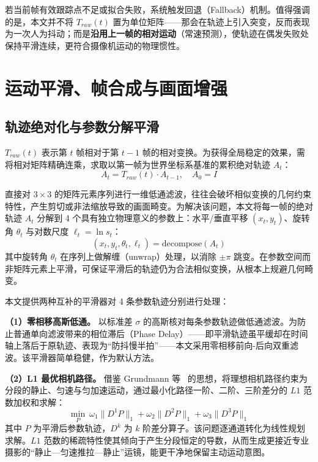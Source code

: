\documentclass[10.5pt,twocolumn]{aaas}
\begin{document}
若当前帧有效跟踪点不足或拟合失败，系统触发回退（Fallback）机制。值得强调的是，本文并不将 $T_{raw}(t)$ 置为单位矩阵——那会在轨迹上引入突变，反而表现为一次人为抖动；而是\textbf{沿用上一帧的相对运动}（常速预测），使轨迹在偶发失败处保持平滑连续，更符合摄像机运动的物理惯性。

\section{运动平滑、帧合成与画面增强}
\subsection{轨迹绝对化与参数分解平滑}
$T_{raw}(t)$ 表示第 $t$ 帧相对于第 $t-1$ 帧的相对变换。为获得全局稳定的效果，需将相对矩阵精确连乘，求取以第一帧为世界坐标系基准的累积绝对轨迹 $A_t$：
\begin{equation}
A_t = T_{raw}(t) \cdot A_{t-1}, \quad A_0 = I
\end{equation}

直接对 $3 \times 3$ 的矩阵元素序列进行一维低通滤波，往往会破坏相似变换的几何约束特性，产生剪切或非法缩放导致的画面畸变。为解决该问题，本文将每一帧的绝对轨迹 $A_t$ 分解到 4 个具有独立物理意义的参数上：水平/垂直平移 $(x_t, y_t)$、旋转角 $\theta_t$ 与对数尺度 $\ell_t=\ln s_t$：
\begin{equation}
(x_t, y_t, \theta_t, \ell_t) = \mathrm{decompose}(A_t)
\end{equation}
其中旋转角 $\theta_t$ 在序列上做解缠（unwrap）处理，以消除 $\pm\pi$ 跳变。在参数空间而非矩阵元素上平滑，可保证平滑后的轨迹仍为合法相似变换，从根本上规避几何畸变。

本文提供两种互补的平滑器对 4 条参数轨迹分别进行处理：

\textbf{（1）零相移高斯低通。} 以标准差 $\sigma$ 的高斯核对每条参数轨迹做低通滤波。为防止普通单向滤波带来的相位滞后（Phase Delay）——即平滑轨迹虽平缓却在时间轴上落后于原轨迹、表现为“防抖慢半拍”——本文采用零相移前向-后向双重滤波。该平滑器简单稳健，作为默认方法。

\textbf{（2）L1 最优相机路径。} 借鉴 Grundmann 等~\cite{grundmann2011} 的思想，将理想相机路径约束为分段的静止、匀速与匀加速运动，通过最小化路径一阶、二阶、三阶差分的 $L1$ 范数加权和求解：
\begin{equation}
\min_{P}\ \omega_1\|D^1P\|_1 + \omega_2\|D^2P\|_1 + \omega_3\|D^3P\|_1
\end{equation}
其中 $P$ 为平滑后参数轨迹，$D^k$ 为 $k$ 阶差分算子。该问题逐通道转化为线性规划求解。$L1$ 范数的稀疏特性使其倾向于产生分段恒定的导数，从而生成更接近专业摄影的“静止—匀速推拉—静止”运镜，能更干净地保留主动运动意图。
\end{document}
